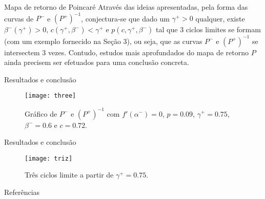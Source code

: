 \documentclass[aspectratio=169]{beamer}
\begin{document}
\begin{frame}{Mapa de retorno de Poincaré}
    Através das ideias apresentadas, pela forma das curvas de $P^-$ e $(P^+)^{-1}$, conjectura-se que dado um $\gamma^+>0$ qualquer, existe $ \beta^-(\gamma^+)>0$, $c(\gamma^+, \beta^-)<\gamma^+$ e $p(c, \gamma^+, \beta^-)$ tal que 3 ciclos limites se formam (com um exemplo fornecido na Seção 3), ou seja, que as curvas $P^-$ e $(P^+)^{-1}$ se intersectem 3 vezes. Contudo, estudos mais aprofundados do mapa de retorno $P$ ainda precisem ser efetuados para uma conclusão concreta.
\end{frame}

\begin{frame}{Resultados e conclusão}
    \begin{figure}[H]
\centering
\texttt{[image: three]}\\
\vspace{\baselineskip}
\caption{\label{three}Gráfico de $P^-$ e $(P^+)^{-1}$ com $f'\left( \alpha^-\right)=0$, $p=0.09$, $\gamma^+=0.75$, $\beta^-=0.6$ e $ c=0.72$.}
\end{figure}
\end{frame}

\begin{frame}{Resultados e conclusão}
    \begin{figure}[H]
\centering
\texttt{[image: triz]}\\
\vspace{\baselineskip}
\caption{\label{triz}Três ciclos limite a partir de $\gamma^+=0.75$.}
\end{figure}
\end{frame}

\begin{frame}{Referências}
\nocite{*}

\footnotesize

\end{frame}
\end{document}
